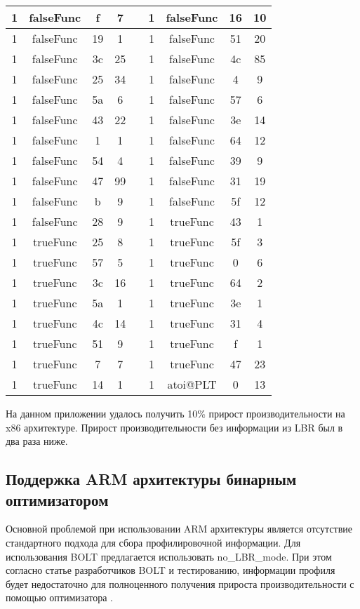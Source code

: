 \begin{table} [!h]
\begin{threeparttable}
\begin{SingleSpace}
\begin{tabular}{| c | c | c | c | c | c | c | c | c |}
			1& falseFunc& f & 7 & &
			1& falseFunc& 16& 10 \\ \hline
			1& falseFunc& 19& 1 & &
			1& falseFunc& 51& 20 \\ \hline
			1& falseFunc& 3c& 25 & &
			1& falseFunc& 4c& 85 \\ \hline
			1& falseFunc& 25& 34 & &
			1& falseFunc& 4 & 9 \\ \hline
			1& falseFunc& 5a& 6 & &
			1& falseFunc& 57& 6 \\ \hline
			1& falseFunc& 43& 22 & &
			1& falseFunc& 3e& 14 \\ \hline
			1& falseFunc& 1 & 1 & &
			1& falseFunc& 64& 12 \\ \hline
			1& falseFunc& 54& 4 & &
			1& falseFunc& 39& 9 \\ \hline
			1& falseFunc& 47& 99 & &
			1& falseFunc& 31& 19 \\ \hline
			1& falseFunc& b & 9 & &
			1& falseFunc& 5f& 12 \\ \hline
			1& falseFunc& 28& 9 & &
			1& trueFunc&  43& 1 \\ \hline
			1& trueFunc&  25& 8 & &
			1& trueFunc&  5f& 3 \\ \hline
			1& trueFunc&  57& 5 & &
			1& trueFunc&  0 & 6 \\ \hline
			1& trueFunc&  3c& 16 & &
			1& trueFunc&  64& 2 \\ \hline
			1& trueFunc&  5a& 1 & &
			1& trueFunc&  3e& 1 \\ \hline
			1& trueFunc&  4c& 14 & &
			1& trueFunc&  31& 4 \\ \hline
			1& trueFunc&  51& 9 & &
			1& trueFunc&  f & 1 \\ \hline
			1& trueFunc&  7 & 7 & &
			1& trueFunc&  47& 23 \\ \hline
			1& trueFunc&  14& 1 & &
			1& atoi@PLT&  0 & 13 \\ \hline
            \end{tabular}%
        \end{SingleSpace}
    \end{threeparttable}
\end{table}

На данном приложении удалось получить 10\% прирост производительности на x86 архитектуре. Прирост производительности без информации из LBR был в два раза ниже.

\subsection{Поддержка ARM архитектуры бинарным оптимизатором}\label{subsec:ch1/sec3/sub4}
Основной проблемой при использовании ARM архитектуры является отсутствие стандартного подхода для сбора профилировочной информации. Для использования BOLT предлагается использовать no\_LBR\_mode. При этом согласно статье разработчиков BOLT и тестированию, информации профиля будет недостаточно для полноценного получения прироста производительности с помощью оптимизатора \cite{Panchenko2019}.


